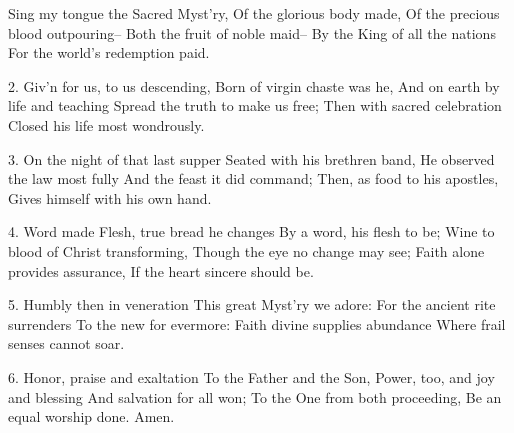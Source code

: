 Sing my tongue the Sacred Myst'ry,
Of the glorious body made,
Of the precious blood outpouring--
Both the fruit of noble maid--
By the King of all the nations
For the world's redemption paid.

2. Giv'n for us, to us descending,
Born of virgin chaste was he,
And on earth by life and teaching
Spread the truth to make us free;
Then with sacred celebration
Closed his life most wondrously.

3. On the night of that last supper
Seated with his brethren band,
He observed the law most fully
And the feast it did command;
Then, as food to his apostles,
Gives himself with his own hand.

4. Word made Flesh, true bread he changes
By a word, his flesh to be;
Wine to blood of Christ transforming,
Though the eye no change may see;
Faith alone provides assurance,
If the heart sincere should be.

5. Humbly then in veneration
This great Myst'ry we adore:
For the ancient rite surrenders
To the new for evermore:
Faith divine supplies abundance
Where frail senses cannot soar.

6. Honor, praise and exaltation
To the Father and the Son,
Power, too, and joy and blessing
And salvation for all won;
To the One from both proceeding,
Be an equal worship done.
Amen.
